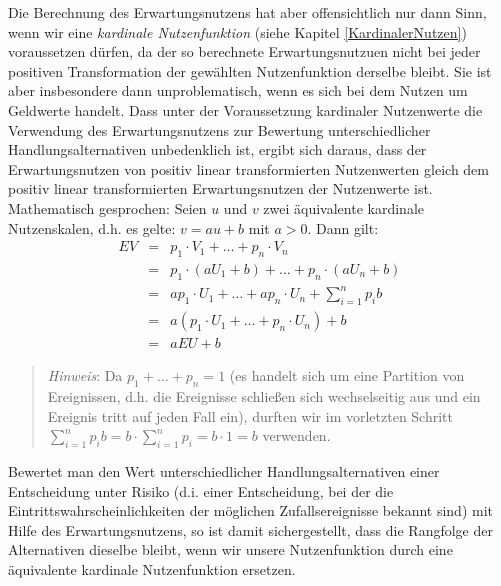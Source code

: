  Die Berechnung des Erwartungsnutzens hat aber offensichtlich nur
dann Sinn, wenn wir eine {\em kardinale Nutzenfunktion} (siehe Kapitel
\ref{KardinalerNutzen}) voraussetzen dürfen, da der so berechnete
Erwartungsnutzuen nicht bei jeder positiven Transformation der gewählten
Nutzenfunktion derselbe bleibt. Sie ist aber insbesondere dann unproblematisch,
wenn es sich bei dem Nutzen um Geldwerte handelt. Dass unter der Voraussetzung
kardinaler Nutzenwerte die Verwendung des Erwartungsnutzens zur Bewertung
unterschiedlicher Handlungsalternativen unbedenklich ist, ergibt sich daraus,
dass der Erwartungsnutzen von positiv linear transformierten Nutzenwerten gleich
dem positiv linear transformierten Erwartungsnutzen der Nutzenwerte ist.
Mathematisch gesprochen: Seien $u$ und $v$ zwei äquivalente kardinale
Nutzenskalen, d.h. es gelte: $v = au + b$ mit $a > 0$. Dann gilt:
\begin{eqnarray*}
EV & = & p_1 \cdot V_1 + \ldots + p_n \cdot V_n \nonumber \\
{ }  & = & p_1 \cdot (aU_1 + b) + \ldots + p_n \cdot (aU_n + b) \nonumber \\
{ }  & = & ap_1 \cdot U_1 + \ldots + ap_n \cdot U_n + \sum_{i=1}^n p_ib
\nonumber \\ 
{ }  & = & a(p_1 \cdot U_1 + \ldots + p_n \cdot U_n) + b \nonumber
\\ & = & aEU + b 
\end{eqnarray*}
\begin{quote}{\em Hinweis}: Da $p_1+\ldots+p_n=1$ (es handelt sich um eine
Partition von Ereignissen, d.h. die Ereignisse schließen sich wechselseitig
aus und ein Ereignis tritt auf jeden Fall ein), durften wir im
vorletzten Schritt $\sum_{i=1}^n p_ib = b\cdot \sum_{i=1}^n p_i = b \cdot 1 = b$
verwenden.\end{quote}

Bewertet man den Wert unterschiedlicher Handlungsalternativen
einer Entscheidung unter Risiko (d.i. einer Entscheidung, bei der die
Eintrittswahrscheinlichkeiten der möglichen Zufallsereignisse bekannt sind) mit
Hilfe des Erwartungsnutzens, so ist damit sichergestellt, dass die Rangfolge der
Alternativen dieselbe bleibt, wenn wir unsere Nutzenfunktion durch eine
äquivalente kardinale Nutzenfunktion ersetzen. 


